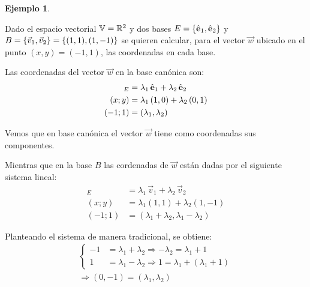 \documentclass[a5paper,12pt,twoside]{book}
\newtheorem{example}{{Ejemplo}}[chapter]
\begin{document}
\begin{mdframed}[style=ExampleFrame]
    \begin{example}
    \end{example}
    Dado el espacio vectorial $\mathbb{V}=\mathbb{R}^2$ y dos bases $E={ \left\{ {\hat{\textbf{e}}_1,\hat{\textbf{e}}_2} \right\} }$ y $B={ \left\{ {\Vec{v}_1,\Vec{v}_2} \right\} }={ \left\{ {(1,1),(1,-1)} \right\} }$ se quieren calcular, para el vector $\Vec{w}$ ubicado en el punto $(x,y)=(-1,1)$, las coordenadas en cada base.
    
    \begin{center}
        \def\svgwidth{0.6\linewidth}
        
    \end{center}
    
    Las coordenadas del vector $\Vec{w}$ en la base canónica son:
    \begin{align*}
        [\Vec{w}]_E &= \lambda_1 \, \eVer_1 + \lambda_2 \, \eVer_2
        \\
        (x;y) &= \lambda_1 \left(1,0\right) + \lambda_2 \left(0,1\right)
        \\
        (-1;1) &= (\lambda_1,\lambda_2)
    \end{align*}
    
    Vemos que en base canónica el vector $\Vec{w}$ tiene como coordenadas sus componentes.
    
    Mientras que en la base $B$ las cordenadas de $\Vec{w}$ están dadas por el siguiente sistema lineal:
    \begin{align*}
        [\Vec{w}]_E &= \lambda_1 \, \Vec{v}_1 + \lambda_2 \, \Vec{v}_2
        \\
        (x;y) &= \lambda_1 \left(1,1\right) + \lambda_2 \left(1,-1\right)
        \\
        (-1;1) &= (\lambda_1+\lambda_2,\lambda_1-\lambda_2)
    \end{align*}
    
    Planteando el sistema de manera tradicional, se obtiene:
    \begin{gather*}
        \left\{
        \begin{aligned}
            -1 &= \lambda_1+\lambda_2 \Rightarrow -\lambda_2=\lambda_1+1 
            \\
            1 &= \lambda_1-\lambda_2 \Rightarrow 1=\lambda_1+(\lambda_1+1)
        \end{aligned}
        \right.
        \\
        \Rightarrow (0,-1) = (\lambda_1,\lambda_2)
    \end{gather*}
    

\end{mdframed}
\end{document}
